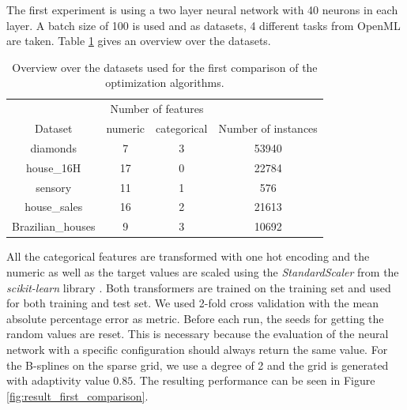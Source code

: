 The first experiment is using a two layer neural network with 40 neurons in each layer. A batch size of 100 is used and as datasets, 4 different tasks from OpenML are taken. Table \ref{tab:datasets_first_experiment} gives an overview over the datasets. 

\begin{table}[htbp!]
	\centering
	\caption{ Overview over the datasets used for the first comparison of the optimization algorithms. }
	\label{tab:datasets_first_experiment}
	\begin{tabular}{| c | c | c | c |} 
		\hline
		 & \multicolumn{2}{c|}{Number of features} &   \\
		 Dataset& numeric & categorical & Number of instances  \\
		 \hline
		 diamonds & 7 & 3 & 53940  \\
		 house\_16H & 17 & 0 & 22784  \\
		 sensory & 11 & 1 & 576  \\
		 house\_sales & 16 & 2 & 21613  \\
		 Brazilian\_houses & 9 & 3 & 10692  \\
		\hline
	\end{tabular}
\end{table}

All the categorical features are transformed with one hot encoding and the numeric as well as the target values are scaled using the \textit{StandardScaler} from the \textit{scikit-learn} library \cite{scikit-learn}. Both transformers are trained on the training set and used for both training and test set. We used 2-fold cross validation with the mean absolute percentage error as metric. Before each run, the seeds for getting the random values are reset. This is necessary because the evaluation of the neural network with a specific configuration should always return the same value. For the B-splines on the sparse grid, we use a degree of 2 and the grid is generated with adaptivity value $ 0.85 $. The resulting performance can be seen in Figure \ref{fig:result_first_comparison}.

